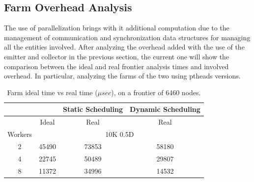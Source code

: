 \subsection{Farm Overhead Analysis}
The use of parallelization brings with it additional computation due to the management of communication and synchronization data structures for managing all the entities involved.
After analyzing the overhead added with the use of the emitter and collector in the previous section, the current one will show the comparison between the ideal and real frontier analysis times and involved overhead. In particular, analyzing the farms of the two using ptheads versions.

\begin{table}[!htb]
    \centering
    \begin{tabular}{cc|c|c|}
    \cline{3-4}
    \multicolumn{1}{l}{}          & \multicolumn{1}{l|}{} & \multicolumn{1}{l|}{Static Scheduling} & \multicolumn{1}{l|}{Dynamic Scheduling} \\ \hline
    \multicolumn{1}{|c|}{}        & Ideal                 & Real                                   & Real                                    \\ \hline
    \multicolumn{1}{|c|}{Workers} & \multicolumn{3}{c|}{10K 0.5D}                                                                            \\ \hline
    \multicolumn{1}{|c|}{2}       & 45490                 & 73853                                  & 58180                                   \\ \hline
    \multicolumn{1}{|c|}{4}       & 22745                 & 50489                                  & 29807                                   \\ \hline
    \multicolumn{1}{|c|}{8}       & 11372                 & 34996                                  & 14532                                   \\ \hline
    \end{tabular}
    \caption{Farm ideal time vs real time ($\mu sec$), on a frontier of 6460 nodes.}
    \label{table:farm_overhead}
\end{table}

